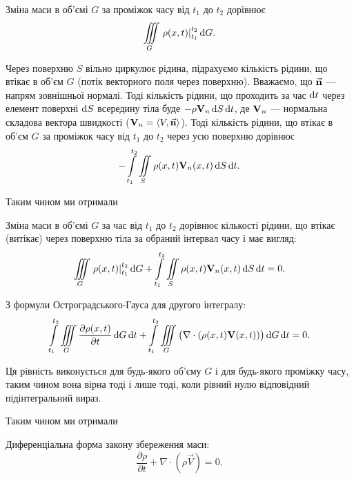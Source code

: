 Зміна маси в об'ємі $G$ за проміжок часу від $t_1$ до $t_2$ дорівнює 
\begin{equation}
	\Iiint_G \left. \rho(x, t) \right|_{t_1}^{t_2} \diff G.
\end{equation}

Через поверхню $S$ вільно циркулює рідина, підрахуємо кількість рідини, що втікає в об'єм $G$ (потік векторного поля через поверхню). Вважаємо, що $\vec{\bf{n}}$ --- напрям зовнішньої нормалі. Тоді кількість рідини, що проходить за час $\diff t$ через елемент поверхні $\diff S$ всередину тіла буде $- \rho \bf{V}_n \diff S \diff t$, де $\bf{V}_n$ --- нормальна складова вектора швидкості ($\bf{V}_n = \langle V, \vec{\bf{n}} \rangle$). Тоді кількість рідини, що втікає в об'єм $G$ за проміжок часу від $t_1$ до $t_2$ через усю поверхню дорівнює
\begin{equation}
	-\Int_{t_1}^{t_2} \Iint_S \rho(x, t) \bf{V}_n(x, t) \diff S \diff t.
\end{equation}

Таким чином ми отримали
\begin{law*}
	\label{laq:mass-conservation}
	Зміна маси в об'ємі $G$ за час від $t_1$ до $t_2$ дорівнює кількості рідини, що втікає (витікає) через поверхню тіла за обраний інтервал часу і має вигляд:
	\begin{equation}
		\Iiint_G \left. \rho(x, t) \right|_{t_1}^{t_2} \diff G + \Int_{t_1}^{t_2} \Iint_S \rho(x, t) \bf{V}_n(x, t) \diff S \diff t = 0.
	\end{equation}
\end{law*}

З формули Остроградського-Гауса для другого інтегралу:
\begin{equation}
	\Int_{t_1}^{t_2} \Iiint_G \frac{\partial \rho(x, t)}{\partial t} \diff G \diff t+ \Int_{t_1}^{t_2} \Iiint_G \big( \nabla \cdot ( \rho(x, t) \bf{V}(x, t)) \big) \diff G \diff t = 0.
\end{equation}

Ця рівність виконується для будь-якого об'єму $G$ і для будь-якого проміжку часу, таким чином вона вірна тоді і лише тоді, коли рівний нулю відповідний підінтегральний вираз. \medskip

Таким чином ми отримали
\begin{th_equation}[нерозривності]
	Диференціальна форма закону збереження маси:
	\begin{equation}
		\frac{\partial \rho}{\partial t} + \nabla \cdot \left( \rho \vec V \right) = 0.
	\end{equation}
\end{th_equation}

